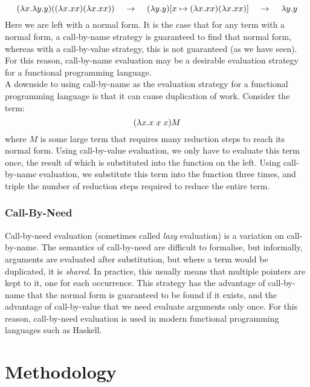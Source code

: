 \documentclass{article}
\begin{document}
\[ (\lambda x.\lambda y.y)((\lambda x.xx)(\lambda x.xx)) \hspace{4mm} \rightarrow \hspace{4mm} (\lambda y.y)[x \mapsto (\lambda x.xx)(\lambda x.xx)] \hspace{4mm} \rightarrow \hspace{4mm} \lambda y.y \]
Here we are left with a normal form. It is the case that for any term with a normal form, a call-by-name strategy is guaranteed to find that normal form, whereas with a call-by-value strategy, this is not guaranteed (as we have seen). For this reason, call-by-name evaluation may be a desirable evaluation strategy for a functional programming language.
\\\indent A downside to using call-by-name as the evaluation strategy for a functional programming language is that it can cause duplication of work. Consider the term:
\[ (\lambda x.x \hspace{1mm} x \hspace{1mm} x)M \]
where $M$ is some large term that requires many reduction steps to reach its normal form. Using call-by-value evaluation, we only have to evaluate this term once, the result of which is substituted into the function on the left. Using call-by-name evaluation, we substitute this term into the function three times, and triple the number of reduction steps required to reduce the entire term.
\subsubsection{Call-By-Need}
Call-by-need evaluation (sometimes called \emph{lazy} evaluation) is a variation on call-by-name. The semantics of call-by-need are difficult to formalise, but informally, arguments are evaluated after substitution, but where a term would be duplicated, it is \emph{shared}. In practice, this usually means that multiple pointers are kept to it, one for each occurrence. This strategy has the advantage of call-by-name that the normal form is guaranteed to be found if it exists, and the advantage of call-by-value that we need evaluate arguments only once. For this reason, call-by-need evaluation is used in modern functional programming languages such as Haskell.

\pagebreak
\section{Methodology}
\end{document}

